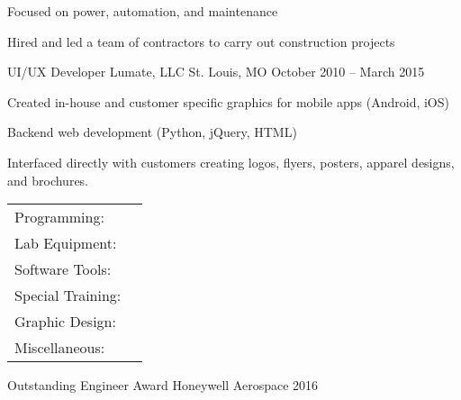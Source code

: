 \documentclass[]{awesome-cv}
\begin{document}
\begin{cventries}
{\begin{cvitems}
		\item {Focused on power, automation, and maintenance}
		\item {Hired and led a team of contractors to carry out construction projects}
		\end{cvitems}}
	\cventry
	{UI/UX Developer}
	{Lumate, LLC}
	{St. Louis, MO}
	{October 2010 – March 2015}
	{\begin{cvitems}
		\item {Created in-house and customer specific graphics for mobile apps (Android, iOS)}
		\item {Backend web development (Python, jQuery, HTML)}
		\item {Interfaced directly with customers creating logos, flyers, posters, apparel designs, and brochures.}
		\end{cvitems}}
\end{cventries}
\begin{cventries}
	\cventry
	{}
	{\def\arraystretch{1.15}{\begin{tabular}{ l l}
		Programming:  & {\skill{ VB.NET, Python, Java, MATLAB, Powershell, Github, Subversion, TestStand, ADB, VISA}} \\
		Lab Equipment:  & {\skill{ Oscilloscopes, DMM, VNA, power supplies, multi-meters, Raspberry Pi, Arduino, PXI}} \\
		Software Tools:  & {\skill{ Schematic capture, PCB layout, Mentor Graphics, CADSTAR, OrCad, SPICE, Solidworks}} \\
		Special Training:  & {\skill{ Advanced GNSS/GPS, Radar Systems Certificate, MIL-STD 1553}} \\
		Graphic Design:  & {\skill{ Photoshop, Illustrator, LaTeX}} \\
		Miscellaneous:  & {\skill{ MS Office, MS Project, Excel, Android, Linux, Windows, Jira}} \\
		\end{tabular}}}
	{}
	{}
	{}
\end{cventries}

\vspace{-7mm}

\begin{cvhonors}
	\cvhonor
	{Outstanding Engineer Award}
	{Honeywell Aerospace }
	{}
	{2016}
\end{cvhonors}
\end{document}
